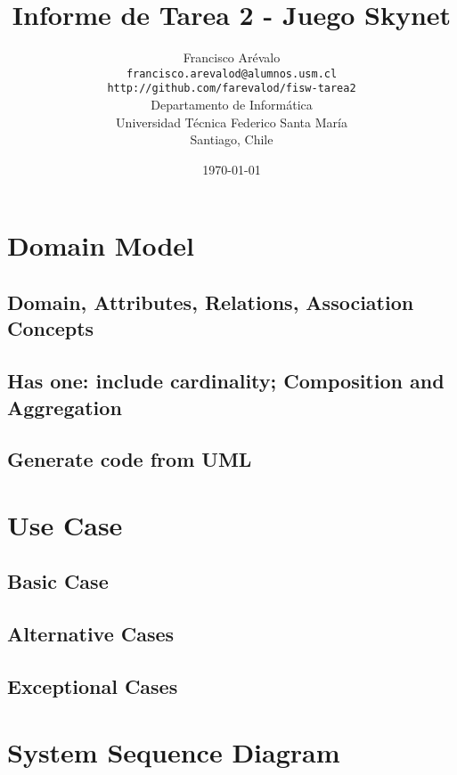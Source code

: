 \documentclass{beamer}
\title{Informe de Tarea 2 - Juego Skynet}
\author{Francisco Ar\'evalo\\
  \texttt{francisco.arevalod@alumnos.usm.cl}\\
  \texttt{http://github.com/farevalod/fisw-tarea2}\\
  \vspace{10mm}
  Departamento de Inform\'atica\\
  Universidad T\'ecnica Federico Santa Mar\'ia\\
  Santiago, Chile}
\date{\today}
\begin{document}
\maketitle
\tableofcontents
\section{Domain Model}
\begin{frame}
\subsection{Domain, Attributes, Relations, Association Concepts}
\subsection{Has one: include cardinality; Composition and Aggregation}
\subsection{Generate code from UML}
\end{frame}
\section{Use Case}
\begin{frame}
\subsection{Basic Case}
\subsection{Alternative Cases}
\subsection{Exceptional Cases}
\end{frame}
\section{System Sequence Diagram}
\begin{frame}
\end{frame}
\end{document}

